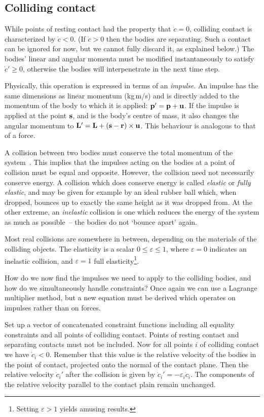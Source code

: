 \subsection{Colliding contact\label{collidingContact}}

While points of resting contact had the property that $\dot{c} = 0$, colliding contact is
characterized by $\dot{c} < 0$. (If $\dot{c} > 0$ then the bodies are separating.
Such a contact can be ignored for now, but we cannot fully discard it, as explained
below.) The bodies' linear and angular momenta must be modified instantaneously to satisfy
$\dot{c}' \ge 0$, otherwise the bodies will interpenetrate in the next time step.

Physically, this operation is expressed in terms of an \emph{impulse}. An impulse  has the
same dimensions as linear momentum  (kg\,m/s) and is directly added to the momentum of the
body to which it is applied: $\ve{p}' = \ve{p} + \ve{u}$. If the impulse is applied at the point
$\ve{s}$, and  is the body's centre of mass, it also changes the angular momentum to
$\ve{L}' = \ve{L} + (\ve{s} - \ve{r})\times\ve{u}$. This behaviour is analogous to that of a
force.

A collision between two bodies must conserve the total momentum of the system~\cite{Feynman:63}.
This implies that the impulses acting on the bodies at a point of collision must be equal and
opposite. However, the collision need not necessarily conserve energy. A collision which does
conserve energy is called \emph{elastic} or \emph{fully elastic}, and may be given for example
by an ideal rubber ball which, when dropped, bounces up to exactly the same height as it was
dropped from. At the other extreme, an \emph{inelastic} collision is one which reduces the energy
of the system as much as possible~-- the bodies do not `bounce apart' again.

Most real collisions are somewhere in between, depending on the materials of the colliding
objects. The elasticity is a scalar $0 \le \varepsilon \le 1$, where $\varepsilon = 0$ indicates
an inelastic collision, and $\varepsilon = 1$ full elasticity\footnote{Setting $\varepsilon > 1$
yields amusing results.}.

How do we now find the impulses we need to apply to the colliding bodies, and how do we
simultaneously handle constraints? Once again we can use a Lagrange multiplier method, but a new
equation must be derived which operates on impulses rather than on forces.

Set up a vector  of concatenated constraint functions including all equality constraints
and all points of colliding contact. Points of resting contact and separating contacts must
not be included. Now for all points $i$ of colliding contact we have $\dot{c}_i < 0$.
Remember that this value is the relative velocity of the bodies in the point of contact,
projected onto the normal of the contact plane. Then the relative velocity $\dot{c}_i'$ after
the collision is given by $\dot{c}_i' = -\varepsilon_i \dot{c}_i$. The components of the relative
velocity parallel to the contact plain remain unchanged.

